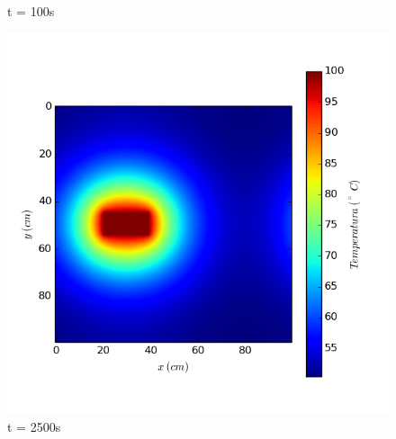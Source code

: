 \documentclass{article}
\begin{document}
\begin{figure}[H]
  \caption{t = 100s}\label{fig:awesome_image2}
\endminipage\hfill
{}%
  \includegraphics[width=\linewidth]{periodicasCte2500.png}
  \caption{t = 2500s}\label{fig:awesome_image3}
\endminipage
\end{figure}
\end{document}
